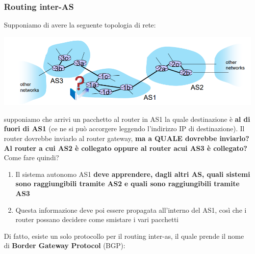 \documentclass[12pt]{article}
\begin{document}
\subsubsection{Routing inter-AS}
Supponiamo di avere la seguente topologia di rete:
\begin{center}
    \includegraphics[width =1\linewidth]{Images/113.png}
\end{center}
supponiamo che arrivi un pacchetto al router in AS1 la quale destinazione è \textbf{al di fuori di AS1} (ce ne si può accorgere leggendo l'indirizzo IP di destinazione).
Il router dovrebbe inviarlo al router gateway, \textbf{ma a QUALE dovrebbe inviarlo? Al router a cui AS2 è collegato oppure al router acui AS3 è collegato?}
Come fare quindi?
\begin{enumerate}
    \item Il sistema autonomo AS1 \textbf{deve apprendere, dagli altri AS, quali sistemi sono raggiungibili tramite AS2 e quali sono raggiungibili tramite AS3}
    \item Questa informazione deve poi essere propagata all'interno del AS1, così che i router possano decidere come smistare i vari pacchetti
\end{enumerate}
Di fatto, esiste un solo protocollo per il routing inter-as, il quale prende il nome di \textbf{Border Gateway Protocol} (BGP):
\end{document}
